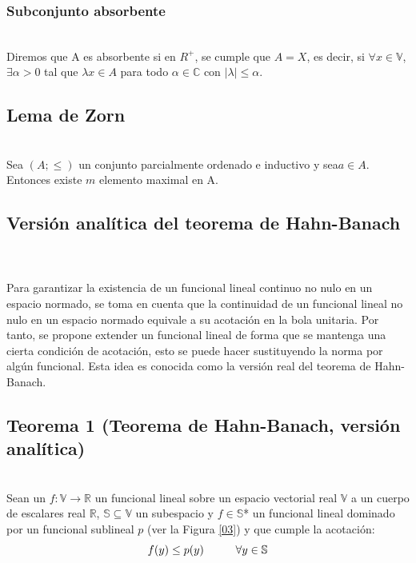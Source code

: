 \documentclass[10pt]{amsart}
\theoremstyle{remark}
\numberwithin{equation}{section}
\begin{document}
\subsubsection{Subconjunto absorbente} \ \\ Diremos que A es absorbente si en $R^{+}$, se cumple que $A = X$, es decir, si $\forall x \in \mathbb{V}$, $\exists \alpha > 0$ tal que $\lambda x \in A$ para todo $\alpha \in \mathbb{C}$ con $\mid \lambda \mid \leq \alpha $. \subsection{Lema de Zorn} \ \\
Sea $(A;\leq)$ un conjunto parcialmente ordenado e inductivo y sea$a \in A$. Entonces existe $m$ elemento maximal en A.


\subsection{Versión analítica del teorema de Hahn-Banach}\label{v1} \cite{ArtAca01}\\ \\ Para garantizar la existencia de un funcional lineal continuo no nulo en un espacio normado, se toma en cuenta que la continuidad de un funcional lineal no nulo en un espacio normado equivale a su acotación en la bola unitaria. Por tanto, se propone extender un funcional lineal de forma que se mantenga una cierta condición de acotación, esto se puede hacer sustituyendo la norma por algún funcional. Esta idea es conocida como la versión real del teorema de Hahn-Banach.\\

\subsection*{Teorema 1 (Teorema de Hahn-Banach, versión analítica)} \ \\
Sean un $f: \mathbb{V} \longrightarrow \mathbb{R}$ un funcional lineal sobre un espacio vectorial real $\mathbb{V}$ a un cuerpo de escalares real $\mathbb{R}$, $ \mathbb{S} \subseteq \mathbb{V}$ un subespacio y $f \in \mathbb{S}$* un funcional lineal dominado por un funcional sublineal $p$ (ver la Figura \ref{03}) y que cumple la acotación:\\
\[f(y) \leq p(y) \hspace*{1cm} \forall y \in \mathbb{S} \]
\end{document}
